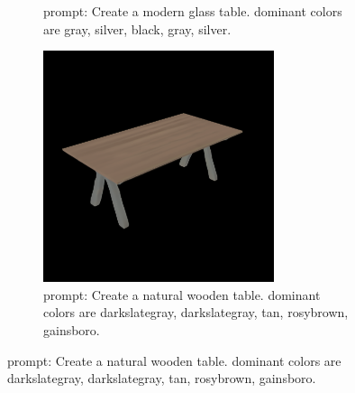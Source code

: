\documentclass[11pt]{article}
\begin{document}
\begin{figure}[htbp]
\begin{subfigure}[t]{0.3\textwidth}
        \caption{prompt: Create a modern glass table. dominant colors are gray, silver, black, gray, silver.}
        \label{fig:modern_furniture}
    \end{subfigure}
    \hfill
    \begin{subfigure}[t]{0.3\textwidth}
        \centering
        \includegraphics[width=\textwidth]{figures/natural_furniture.png}
        \caption{prompt: Create a natural wooden table. dominant colors are darkslategray, darkslategray, tan, rosybrown, gainsboro.}
        \label{fig:natural_furniture}
    \end{subfigure}

    \vspace{1em}


\end{figure}
\end{document}
